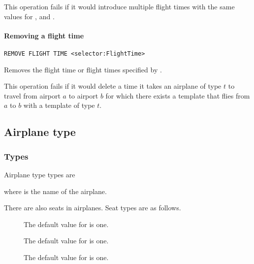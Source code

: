 This operation fails if it would introduce multiple flight times  with the same
values for ,  and .

\paragraph{Removing a flight time}
\begin{operation}
  \lstinline{REMOVE FLIGHT TIME <selector:FlightTime>}
  \label{op:remove_flighttime}
\end{operation}
Removes the flight time or flight times specified by .

This operation fails if it would delete a time it takes an airplane of type $t$
to travel from airport $a$ to airport $b$ for which there exists a template that
flies from $a$ to $b$ with a template of type $t$.

\subsection{Airplane type}
\subsubsection{Types}
Airplane type types are
\begin{description}
  \item[] 
  \item[] 
\end{description}
where  is the name of the airplane.

There are also seats in airplanes. Seat types are as follows.
\begin{description}
  \item[] 
    
    The default value for  is one.

  \item[] 

    The default value for  is one.

  \item[] 

    The default value for  is one.
\end{description}

